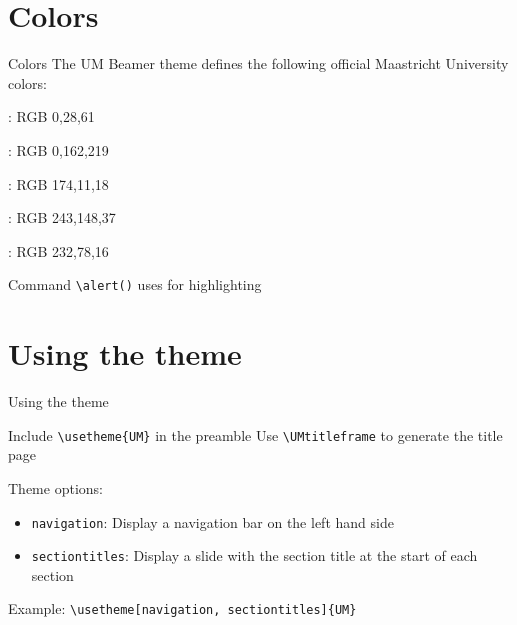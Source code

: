 \documentclass[pdfpagelabels=false, usepdftitle=false, aspectratio=169]{beamer}
\begin{document}

\section{Colors}
\begin{frame}[fragile]{Colors}
The UM Beamer theme defines the following official Maastricht University colors:

\bigskip
\textcolor{UMdarkblue}{}:
RGB 0,28,61

\medskip
\textcolor{UMlightblue}{}: RGB 0,162,219

\medskip
\textcolor{UMred}{}: RGB 174,11,18

\medskip
\textcolor{UMorange}{}: RGB 243,148,37

\medskip
\textcolor{UMorangered}{}: RGB 232,78,16

\vfill

\begin{itemize}
  \arrowitem Command \verb+\alert()+ uses \alert{} for
  highlighting
\end{itemize}
\end{frame}



\section{Using the theme}
\begin{frame}[fragile]{Using the theme}
\vspace{-2ex}
\begin{itemize}
  \arrowitem Include \verb+\usetheme{UM}+ in the preamble
  \arrowitem Use \verb+\UMtitleframe+ to generate the title page
\end{itemize}

\vfill

\alert{Theme options}:
\begin{itemize}
  \item \verb+navigation+: Display a navigation bar on the left hand side
  \item \verb+sectiontitles+: Display a slide with the section title at the
  start of each section
\end{itemize}

\alert{Example}: \verb+\usetheme[navigation, sectiontitles]{UM}+
\end{frame}


\end{document}
